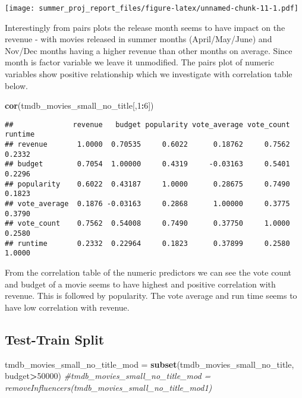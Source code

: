 \documentclass[
]{article}
\newenvironment{Shaded}{\begin{snugshade}}{\end{snugshade}}
\newcommand{\CommentTok}[1]{\textcolor[rgb]{0.56,0.35,0.01}{\textit{#1}}}
\newcommand{\DecValTok}[1]{\textcolor[rgb]{0.00,0.00,0.81}{#1}}
\newcommand{\KeywordTok}[1]{\textcolor[rgb]{0.13,0.29,0.53}{\textbf{#1}}}
\newcommand{\NormalTok}[1]{#1}
\newcommand{\OperatorTok}[1]{\textcolor[rgb]{0.81,0.36,0.00}{\textbf{#1}}}
\newcommand{\StringTok}[1]{\textcolor[rgb]{0.31,0.60,0.02}{#1}}
\begin{document}
\texttt{[image: summer\_proj\_report\_files/figure-latex/unnamed-chunk-11-1.pdf]}

Interestingly from pairs plots the release month seems to have impact on
the revenue - with movies released in summer months (April/May/June) and
Nov/Dec months having a higher revenue than other months on average.
Since month is factor variable we leave it unmodified. The pairs plot of
numeric variables show positive relationship which we investigate with
correlation table below.

\begin{Shaded}
\begin{Highlighting}[]
\KeywordTok{cor}\NormalTok{(tmdb_movies_small_no_title[,}\DecValTok{1}\OperatorTok{:}\DecValTok{6}\NormalTok{])}
\end{Highlighting}
\end{Shaded}

\begin{verbatim}
##              revenue   budget popularity vote_average vote_count runtime
## revenue       1.0000  0.70535     0.6022      0.18762     0.7562  0.2332
## budget        0.7054  1.00000     0.4319     -0.03163     0.5401  0.2296
## popularity    0.6022  0.43187     1.0000      0.28675     0.7490  0.1823
## vote_average  0.1876 -0.03163     0.2868      1.00000     0.3775  0.3790
## vote_count    0.7562  0.54008     0.7490      0.37750     1.0000  0.2580
## runtime       0.2332  0.22964     0.1823      0.37899     0.2580  1.0000
\end{verbatim}

From the correlation table of the numeric predictors we can see the vote
count and budget of a movie seems to have highest and positive
correlation with revenue. This is followed by popularity. The vote
average and run time seems to have low correlation with revenue.

\hypertarget{test-train-split}{%
\subsection{Test-Train Split}\label{test-train-split}}

\begin{Shaded}
\begin{Highlighting}[]
\NormalTok{tmdb_movies_small_no_title_mod =}\StringTok{ }\KeywordTok{subset}\NormalTok{(tmdb_movies_small_no_title, budget}\OperatorTok{>}\DecValTok{50000}\NormalTok{)}
\CommentTok{#tmdb_movies_small_no_title_mod = removeInfluencers(tmdb_movies_small_no_title_mod1)}
\end{Highlighting}
\end{Shaded}
\end{document}

